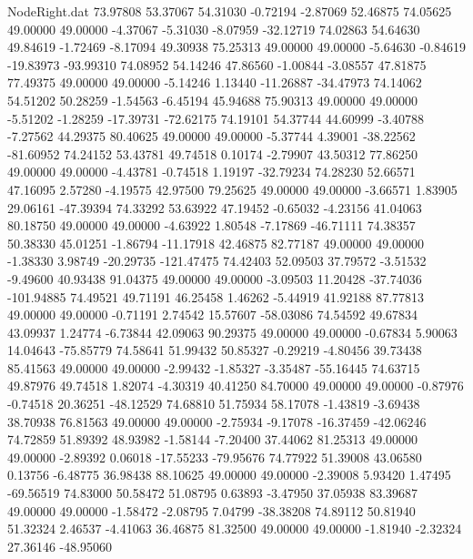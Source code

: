 \begin{filecontents}{NodeRight.dat}
  73.97808   53.37067   54.31030    -0.72194   -2.87069   52.46875   74.05625   49.00000   49.00000   -4.37067   -5.31030   -8.07959  -32.12719
  74.02863   54.64630   49.84619    -1.72469   -8.17094   49.30938   75.25313   49.00000   49.00000   -5.64630   -0.84619  -19.83973  -93.99310
  74.08952   54.14246   47.86560    -1.00844   -3.08557   47.81875   77.49375   49.00000   49.00000   -5.14246    1.13440  -11.26887  -34.47973
  74.14062   54.51202   50.28259    -1.54563   -6.45194   45.94688   75.90313   49.00000   49.00000   -5.51202   -1.28259  -17.39731  -72.62175
  74.19101   54.37744   44.60999    -3.40788   -7.27562   44.29375   80.40625   49.00000   49.00000   -5.37744    4.39001  -38.22562  -81.60952
  74.24152   53.43781   49.74518     0.10174   -2.79907   43.50312   77.86250   49.00000   49.00000   -4.43781   -0.74518    1.19197  -32.79234
  74.28230   52.66571   47.16095     2.57280   -4.19575   42.97500   79.25625   49.00000   49.00000   -3.66571    1.83905   29.06161  -47.39394
  74.33292   53.63922   47.19452    -0.65032   -4.23156   41.04063   80.18750   49.00000   49.00000   -4.63922    1.80548   -7.17869  -46.71111
  74.38357   50.38330   45.01251    -1.86794  -11.17918   42.46875   82.77187   49.00000   49.00000   -1.38330    3.98749  -20.29735 -121.47475
  74.42403   52.09503   37.79572    -3.51532   -9.49600   40.93438   91.04375   49.00000   49.00000   -3.09503   11.20428  -37.74036 -101.94885
  74.49521   49.71191   46.25458     1.46262   -5.44919   41.92188   87.77813   49.00000   49.00000   -0.71191    2.74542   15.57607  -58.03086
  74.54592   49.67834   43.09937     1.24774   -6.73844   42.09063   90.29375   49.00000   49.00000   -0.67834    5.90063   14.04643  -75.85779
  74.58641   51.99432   50.85327    -0.29219   -4.80456   39.73438   85.41563   49.00000   49.00000   -2.99432   -1.85327   -3.35487  -55.16445
  74.63715   49.87976   49.74518     1.82074   -4.30319   40.41250   84.70000   49.00000   49.00000   -0.87976   -0.74518   20.36251  -48.12529
  74.68810   51.75934   58.17078    -1.43819   -3.69438   38.70938   76.81563   49.00000   49.00000   -2.75934   -9.17078  -16.37459  -42.06246
  74.72859   51.89392   48.93982    -1.58144   -7.20400   37.44062   81.25313   49.00000   49.00000   -2.89392    0.06018  -17.55233  -79.95676
  74.77922   51.39008   43.06580     0.13756   -6.48775   36.98438   88.10625   49.00000   49.00000   -2.39008    5.93420    1.47495  -69.56519
  74.83000   50.58472   51.08795     0.63893   -3.47950   37.05938   83.39687   49.00000   49.00000   -1.58472   -2.08795    7.04799  -38.38208
  74.89112   50.81940   51.32324     2.46537   -4.41063   36.46875   81.32500   49.00000   49.00000   -1.81940   -2.32324   27.36146  -48.95060

\end{filecontents}
